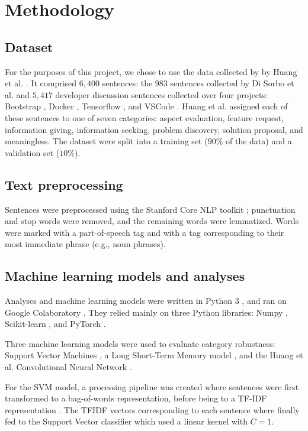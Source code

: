 \documentclass[letterpaper, 12 pt, conference]{ieeeconf}
\begin{document}
\section{Methodology}
\subsection{Dataset}
For the purposes of this project, we chose to use the data collected by by Huang et al. \cite{huang:aim:2018}. It comprised $6,400$ sentences: the $983$ sentences collected by Di Sorbo et al. \cite{disorbo:deca:2016} and $5,417$ developer discussion sentences collected over four projects: Bootstrap \cite{bootstrap}, Docker \cite{docker}, Tensorflow \cite{tensorflow}, and VSCode \cite{vscode}. Huang et al. assigned each of these sentences to one of seven categories: aspect evaluation, feature request, information giving, information seeking, problem discovery, solution proposal, and meaningless. The dataset were split into a training set ($90\%$ of the data) and a validation set ($10\%$).

\subsection{Text preprocessing}
Sentences were preprocessed using the Stanford Core NLP toolkit \cite{StanfordCoreNLP}; punctuation and stop words were removed, and the remaining words were lemmatized. Words were marked with a part-of-speech tag and with a tag corresponding to their most immediate phrase (e.g., noun phrases).

\subsection{Machine learning models and analyses}
Analyses and machine learning models were written in Python 3 \cite{python3}, and ran on Google Colaboratory \cite{Colab}. They relied mainly on three Python libraries: Numpy \cite{numpy}, Scikit-learn \cite{scikit-learn}, and PyTorch \cite{pytorch}. 

Three machine learning models were used to evaluate category robustness: Support Vector Machines \cite{chang:libsvm:2011}, a Long Short-Term Memory model \cite{hochreiter:lstm:1997}, and the Huang et al. Convolutional Neural Network \cite{huang:aim:2018}.

For the SVM model, a processing pipeline was created where sentences were first transformed to a bag-of-words representation, before being to a TF-IDF representation \cite{baeza:tfidf:1999}. The TFIDF vectors corresponding to each sentence where finally fed to the Support Vector classifier which used a linear kernel with $C = 1$.
\end{document}
